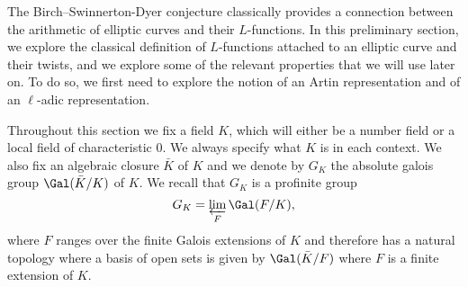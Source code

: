 The Birch--Swinnerton-Dyer conjecture classically provides a connection between the arithmetic of elliptic curves and their $L$-functions. In this preliminary section, we explore the classical definition of $L$-functions attached to an elliptic curve and their twists, and we explore some of the relevant properties that we will use later on. To do so, we first need to explore the notion of an Artin representation and of an $\ell$-adic representation. 

Throughout this section we fix a field $K$, which will either be a number field or a local field of characteristic $0$. We always specify what $K$ is in each context. We also fix an algebraic closure $\bar{K}$ of $K$ and we denote by $G_K$ the absolute galois group $\Gal(\bar{K}/K)$ of $K$. We recall that $G_K$ is a profinite group
$$G_K=\varprojlim_{F}\Gal(F/K),$$
where $F$ ranges over the finite Galois extensions of $K$ and therefore has a natural topology where a basis of open sets is given by $\Gal(\bar{K}/F)$ where $F$ is a finite extension of $K$.




